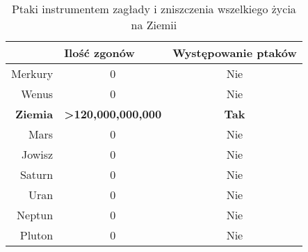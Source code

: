 \begin{table}[h]
\begin{tabular}{|r|c|c|}
\hline
\rowcolor[HTML]{FFFFC7} 
\multicolumn{1}{|l|}{\cellcolor[HTML]{FFFFC7}Planeta} &
  \multicolumn{1}{l|}{\cellcolor[HTML]{FFFFC7}Ilość zgonów} &
  \multicolumn{1}{l|}{\cellcolor[HTML]{FFFFC7}Występowanie ptaków} \\ \hline\hline
Merkury         & 0                           & Nie          \\ \hline
Wenus           & 0                           & Nie          \\ \hline
\textbf{Ziemia} & \textbf{>120,000,000,000} & \textbf{Tak} \\ \hline
Mars            & 0                           & Nie          \\ \hline
Jowisz          & 0                           & Nie          \\ \hline
Saturn          & 0                           & Nie          \\ \hline
Uran            & 0                           & Nie          \\ \hline
Neptun          & 0                           & Nie          \\ \hline
Pluton          & 0                           & Nie          \\ \hline
\end{tabular}
 \centering
\label{fk:tab:ptaki}
\caption{Ptaki instrumentem zagłady i zniszczenia wszelkiego życia na Ziemii}
\end{table}
